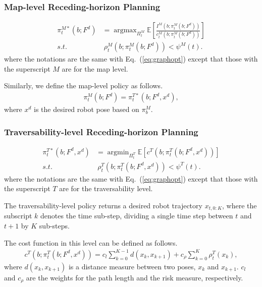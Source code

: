 \documentclass[letterpaper, 10 pt, conference]{ieeeconf}  %
\newcommand{\argmax}{\mathop{\mathrm{argmax}}}
\newcommand{\argmin}{\mathop{\mathrm{argmin}}}
\begin{document}
\subsubsection{Map-level Receding-horizon Planning}

\begin{align}
  \pi_t^{M*}(b; F^d) &= \argmax_{\Pi_t^M} \mathbb{E} \left[ \frac{I^M(b; \pi_t^M(b; F^d))}{c_t^M(b; \pi_t^M(b; F^d))} \right]
  \nonumber \\
  s.t.~&~\rho_t^M(b; \pi_t^M(b; F^d))< \psi^M(t).
  \label{eq:mapopt}
\end{align}
where the notations are the same with Eq.~(\ref{eq:graphopt}) except that those with the superscript $M$ are for the map level.

Similarly, we define the map-level policy as follows.
\begin{align}
  \pi_t^M(b; F^d) = \pi_t^{T*}(b; F^d, x^d),
\end{align}
where $x^d$ is the desired robot pose based on $\pi_b^M$.


\subsubsection{Traversability-level Receding-horizon Planning}

\begin{align}
  \pi_t^{T*}(b; F^d, x^d)
  &= \argmin_{\Pi_t^T} \mathbb{E} \left[ c^T(b; \pi_t^T(b; F^d, x^d)) \right]
  \nonumber \\
  s.t.~&~\rho_t^T(b; \pi_t^T(b; F^d, x^d))< \psi^T(t).
  \label{eq:travopt}
\end{align}
where the notations are the same with Eq.~(\ref{eq:graphopt}) except that those with the superscript $T$ are for the traversability level.

The traversability-level policy returns a desired robot trajectory $x_{t, 0:K}$, where the subscript $k$ denotes the time sub-step, dividing a single time step between $t$ and $t+1$ by $K$ sub-steps.

The cost function in this level can be defined as follows.
\begin{align}
  c^T(b; \pi_t^T(b; F^d, x^d)) = c_l \sum_{k=0}^{K-1} d(x_k, x_{k+1}) + c_\rho \sum_{k=0}^K \rho_t^T(x_k),
\end{align}
where $d(x_k, x_{k+1})$ is a distance measure between two poses, $x_k$ and $x_{k+1}$.
$c_l$ and $c_\rho$ are the weights for the path length and the risk measure, respectively.
\end{document}
